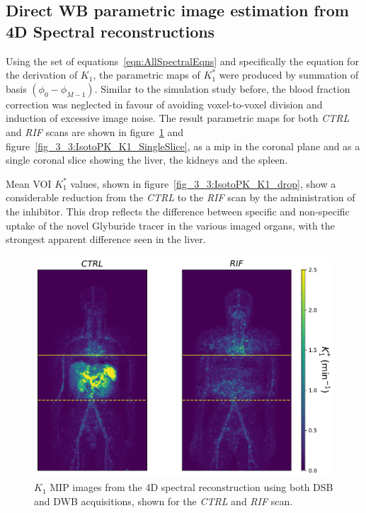 \subsection{Direct WB parametric image estimation from 4D Spectral reconstructions}
Using the set of equations~\ref{eqn:AllSpectralEqns} and specifically the equation for the derivation of $K_1$, the parametric maps of $K_1^{*}$ were produced by summation of basis $(\phi_0-\phi_{M-1})$. Similar to the simulation study before, the blood fraction correction was neglected in favour of avoiding voxel-to-voxel division and induction of excessive image noise. The result parametric maps for both \textit{CTRL} and \textit{RIF} scans are shown in figure~\ref{fig_3_3:IsotoPK_K1_MIP} and figure~\ref{fig_3_3:IsotoPK_K1_SingleSlice}, as a \gls{mip} in the coronal plane and as a single coronal slice showing the liver, the kidneys and the spleen.

Mean VOI $K_1^{*}$ values, shown in figure~\ref{fig_3_3:IsotoPK_K1_drop}, show a considerable reduction from the \textit{CTRL} to the \textit{RIF} scan by the administration of the inhibitor. This drop reflects the difference between specific and non-specific uptake of the novel Glyburide tracer in the various imaged organs, with the strongest apparent difference seen in the liver.

\begin{figure} [ht!]
\centering
\includegraphics[scale=0.5,angle=0]{3_Results/3_3_DWB_Reconstruction/figures/3_3_IsotoPK_K1_MIPs.pdf}
\caption{$K_1$ MIP images from the 4D spectral reconstruction using both DSB and DWB acquisitions, shown for the \textit{CTRL} and \textit{RIF} scan.}
\label{fig_3_3:IsotoPK_K1_MIP}
\end{figure} 

